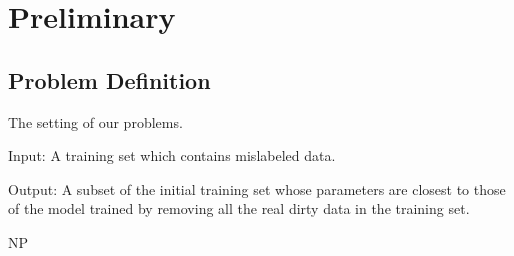 \section{Preliminary} 
\label{sec:pre}

\subsection{Problem Definition}


The setting of our problems.

Input: A training set which contains mislabeled data.

Output: A subset of the initial training set whose parameters are closest to those of the model trained by removing all the real dirty data in the training set.

 NP


